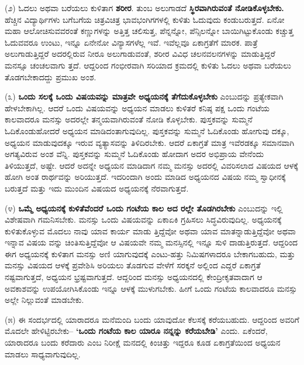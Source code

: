 (೨) ಓದಲು ಅಥವಾ ಬರೆಯಲು ಕುಳಿತಾಗ \textbf{ಶರೀರ}. ತುಂಬ ಅಲುಗಾಡದೆ \textbf{ಸ್ಥಿರವಾಗಿರುವಂತೆ ನೋಡಿಕೊಳ್ಳಬೇಕು.} ಹೆಚ್ಚಿನ ವಿದ್ಯಾರ್ಥಿಗಳು ಬಗೆಬಗೆಯ ಚಿತ್ರವಿಚಿತ್ರ ಭಾವಭಂಗಿಗಗಳಲ್ಲಿ ಕುಳಿತು ಓದುವುದು ಕಂಡುಬರುತ್ತದೆ. ಏನೋ ಮಹಾ ಆಲೋಚಿಸುವವರಂತೆ ಕಣ್ಣುಗಳನ್ನು ಅತ್ತಿತ್ತ ಚಲಿಸುತ್ತ, ಪೆನ್ನನ್ನೋ, ಪೆನ್ಸಿಲನ್ನೋ ಬಾಯಿಗಿಟ್ಟುಕೊಂಡು ಕಚ್ಚುತ್ತ ಓದುವವರೂ ಉಂಟು, ಇನ್ನೂ ಏನೇನೋ ವಿನ್ಯಾಸಗಳೆಲ್ಲ ಇವೆ. ಇವೆಲ್ಲವೂ ಏಕಾಗ್ರತೆಗೆ ಮಾರಕ. ಪಾತ್ರೆ ಅಲುಗಾಡುತ್ತಿದ್ದರೆ ಅದರಲ್ಲಿರುವ ನೀರೂ ಅಲುಗಾಡುವಂತೆ, ಶರೀರ ವಿವಿಧ ಚಲನವಲನಗಳನ್ನು ಮಾಡುತ್ತಿದ್ದರೆ ಮನಸ್ಸೂ ಚಂಚಲವಾಗು ತ್ತದೆ. ಆದ್ದರಿಂದ ಗಂಭೀರವಾಗಿ ಸರಿಯಾದ ಕ್ರಮದಲ್ಲಿ ಕುಳಿತು ಓದಲು ಅಥವಾ ಬರೆಯಲು ತೊಡಗಬೇಕಾದದ್ದು ಪ್ರಮುಖ ಅಂಶ.

(೩)\textbf{ ಒಂದು ಸಲಕ್ಕೆ ಒಂದು ವಿಷಯವನ್ನು ಮಾತ್ರವೇ ಅಧ್ಯಯನಕ್ಕೆ ತೆಗೆದುಕೊಳ್ಳಬೇಕು} ಎಂಬುದನ್ನು ಪ್ರತ್ಯೇಕವಾಗಿ ಹೇಳಬೇಕಾಗಿಲ್ಲ. ಆದರೆ ಒಂದು ವಿಷಯವನ್ನು ಅಧ್ಯಯನ ಮಾಡಲು ಕುಳಿತರೆ ಕನಿಷ್ಠ ಪಕ್ಷ ಒಂದು ಗಂಟೆಯ ಕಾಲವಾದರೂ ಮನಸ್ಸು ಅದರಲ್ಲೇ ತನ್ಮಯವಾಗಿರುವಂತೆ ನೋಡಿ ಕೊಳ್ಳಬೇಕು. ಪುಸ್ತಕವನ್ನು ಸುಮ್ಮನೆ ಓದಿಕೊಂಡುಹೋದರೆ ಅಧ್ಯಯನ ಮಾಡಿದಂತಾಗುವುದಿಲ್ಲ. ಪುಸ್ತಕವನ್ನು ಸುಮ್ಮನೆ ಓದಿಕೊಂಡು ಹೋಗುವು ದಕ್ಕೂ, ಅಧ್ಯಯನ ಮಾಡುವುದಕ್ಕೂ ಇರುವ ವ್ಯತ್ಯಾಸವನ್ನು ತಿಳಿದಿರಬೇಕು. ಆದರೆ ಏಕಾಗ್ರತೆ ಮಾತ್ರ ಇವೆರಡಕ್ಕೂ ಸಮಾನವಾಗಿ ಅಗತ್ಯವಿರುವ ಅಂಶ ವೆನ್ನಿ. ಪುಸ್ತಕವನ್ನು ಸುಮ್ಮನೆ ಓದಿಕೊಂಡು ಹೋದಾಗ ಅದರ ಅಭಿಪ್ರಾಯ ವೇನೆಂದು ತಿಳಿಯುತ್ತದೆ, ಅಷ್ಟೇ. ಆದರೆ ಅದನ್ನೇ ಅಧ್ಯಯನ ಮಾಡಿದಾಗ ನಮ್ಮ ಮನಸ್ಸು ಅದರಲ್ಲಿ ವಿವರಿಸಲಾದ ವಿಷಯದ ಆಳಕ್ಕೆ ಹೋಗಿ ಅಂತ ರಾರ್ಥವನ್ನು ಅರಿಯುತ್ತದೆ. ಇದರಿಂದಾಗಿ ಅಂದು ಮಾಡಿದ ಅಧ್ಯಯನದ ವಿಷಯ ನಮ್ಮ ಸ್ವಾಧೀನಕ್ಕೆ ಬರುತ್ತದೆ ಮತ್ತು ಇದು ಮುಂದಿನ ವಿಷಯದ ಅಧ್ಯಯನಕ್ಕೆ ನೆರವಾಗುತ್ತದೆ. 

(೪)\textbf{ ಒಮ್ಮೆ ಅಧ್ಯಯನಕ್ಕೆ ಕುಳಿತೆವೆಂದರೆ ಒಂದು ಗಂಟೆಯ ಕಾಲ ಅದ ರಲ್ಲೇ ತೊಡಗಿರಬೇಕು} ಎಂಬುದನ್ನು ಇಲ್ಲಿ ವಿಶೇಷವಾಗಿ ಗಮನಿಸಬೇಕು. ಮನಸ್ಸು ಒಂದು ವಿಷಯವನ್ನು ಏಕಾಏಕಿ ಗ್ರಹಿಸಲು ಸಿದ್ಧವಿರುವುದಿಲ್ಲ. ಅಧ್ಯಯನಕ್ಕೆ ಕುಳಿತುಕೊಳ್ಳುವ ಮೊದಲು ನಾವು ಯಾವ ಕಾರ್ಯ ಮಾಡು ತ್ತಿದ್ದೆವೋ ಅಥವಾ ಯಾವ ಮಾತನ್ನಾಡುತ್ತಿದ್ದೆವೋ ಅಥವಾ ಇನ್ನಾವ ವಿಷಯ ವನ್ನು ಚಿಂತಿಸುತ್ತಿದ್ದೆವೋ ಆ ವಿಷಯವೇ ನಮ್ಮ ಮನಸ್ಸಿನಲ್ಲಿ ಇನ್ನೂ ಸುಳಿ ದಾಡುತ್ತಿರುತ್ತದೆ. ಆದ್ದರಿಂದ ಈಗ ಅಧ್ಯಯನಕ್ಕೆ ಕುಳಿತಾಗ ಮನಸ್ಸು ಅಣಿ ಯಾಗುವುದಕ್ಕೆ ಎಂಟು-ಹತ್ತು ನಿಮಿಷಗಳಾದರೂ ಬೇಕಾಗಬಹುದು, ಮತ್ತು ಮನಸ್ಸು ವಿಷಯದ ಆಳಕ್ಕೆ ಪ್ರವೇಶಿಸಿ ಅರಿಯಲು ತೊಡಗುವ ವೇಳೆಗೆ ಸರಕ್ಕನೆ ಅಲ್ಲಿಂದ ಎದ್ದರೆ ಏಕಾಗ್ರತೆ ನಷ್ಟವಾಗುತ್ತದೆ, ಅಧ್ಯಯನ ಭ್ರಷ್ಟವಾಗುತ್ತದೆ. ಆದ್ದರಿಂದ ಮನಸ್ಸು ಅಧ್ಯಯನದಲ್ಲಿ ಕೇಂದ್ರೀಕೃತವಾದಾಗ ಆ ಅವಕಾಶವನ್ನು ಉಪಯೋಗಿಸಿಕೊಂಡು ಇನ್ನೂ ಆಳಕ್ಕೆ ಮುಳುಗಬೇಕು. ಹೀಗೆ ಒಂದು ಗಂಟೆಯ ಕಾಲವಾದರೂ ಮನಸ್ಸು ಅಲ್ಲೇ ನಿಲ್ಲುವಂತೆ ಮಾಡಬೇಕು.

(೫) ಈ ಸಂದರ್ಭದಲ್ಲಿ ಯಾರಾದರೂ ಮನೆಮಂದಿ ಬಂದು ಯಾವುದೋ ಕೆಲಸಕ್ಕೆ ಕರೆಯಬಹುದು. ಆದ್ದರಿಂದ ಅವರಿಗೆ ಮೊದಲೇ ಹೇಳಿಟ್ಟಿರಬೇಕು– \textbf{‘ಒಂದು ಗಂಟೆಯ ಕಾಲ ಯಾರೂ ನನ್ನನ್ನು ಕರೆಯಬೇಡಿ’} ಎಂದು. ಏಕೆಂದರೆ, ಯಾರಾದರೂ ಬಂದು ಕರೆದಾರು ಎಂಬ ನಿರೀಕ್ಷೆ ಮನದಲ್ಲಿ ಕಿಂಚಿತ್ತು ಇದ್ದರೂ ಕೂಡ ಏಕಾಗ್ರತೆಯಿಂದ ಅಧ್ಯಯನ ಮಾಡಲು ಸಾಧ್ಯವಾಗುವುದಿಲ್ಲ.


